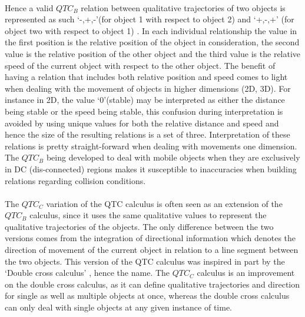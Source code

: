 	\paragraph{}Hence a valid $QTC_B$ relation between qualitative trajectories of two objects is represented as such `{-,+,-}'(for object 1 with respect to object 2) and `{+,-,+}' (for object two with respect to object 1)%
	. In each individual relationship the value in the first position is the relative position of the object in consideration, the second value is the relative position of the other object and the third value is the relative speed of the current object with respect to the other object. The benefit of having a relation that includes both relative position and speed comes to light when dealing with the movement of objects in higher dimensions (2D, 3D). For instance in 2D, the value `0'(stable) may be interpreted as either the distance being stable or the speed being stable, this confusion during interpretation is avoided by using unique values for both the relative distance and speed and hence the size of the resulting relations is a set of three. Interpretation of these relations is pretty straight-forward when dealing with movements one dimension. The $QTC_B$ being developed to deal with mobile objects when they are exclusively in DC (dis-connected) regions \cite{van2006qualitative} makes it susceptible to inaccuracies when building relations regarding collision conditions.
	
	\paragraph{}The $QTC_C$ variation of the QTC calculus is often seen as an extension of the $QTC_B$ calculus, since it uses the same qualitative values to represent the qualitative trajectories of the objects. The only difference between the two versions comes from the integration of directional information which denotes the direction of movement of the current object in relation to a line segment between the two objects. This version of the QTC calculus was inspired in part by the `Double cross calculus' \cite{zimmermann1996qualitative}, hence the name. The $QTC_C$ calculus is an improvement on the double cross calculus, as it can define qualitative trajectories and direction for single as well as multiple objects at once, whereas the double cross calculus can only deal with single objects at any given instance of time.
	
